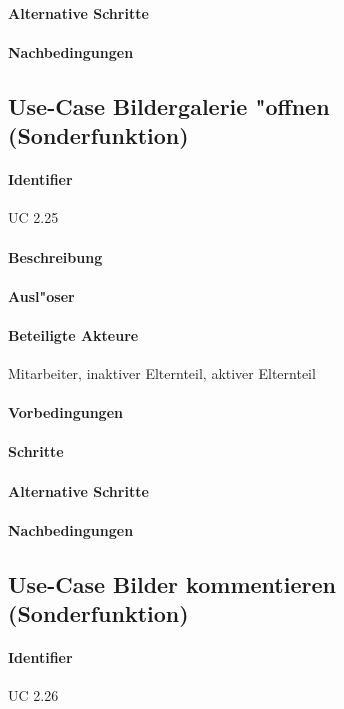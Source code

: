   \paragraph{Alternative Schritte}
  \paragraph{Nachbedingungen}

  
  \newpage
 \subsection{Use-Case Bildergalerie "offnen (Sonderfunktion)}
  \paragraph{Identifier}
  UC 2.25
  \paragraph{Beschreibung}
  \paragraph{Ausl"oser}
  \paragraph{Beteiligte Akteure}   \leavevmode \newline
    Mitarbeiter, inaktiver Elternteil, aktiver Elternteil
  \paragraph{Vorbedingungen}
  \paragraph{Schritte}
  \paragraph{Alternative Schritte}
  \paragraph{Nachbedingungen}

  
  \newpage
 \subsection{Use-Case Bilder kommentieren (Sonderfunktion)}
  \paragraph{Identifier}
  UC 2.26
